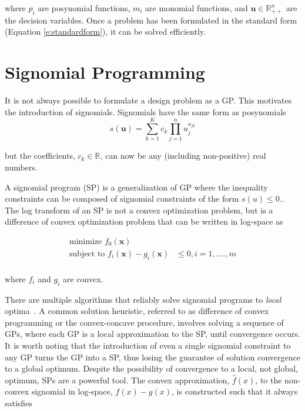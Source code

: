 where $p_{i}$ are posynomial functions, $m_{i}$ are monomial functions, and
$\mathbf{u} \in \mathbb{R}^n_{++}$ are the decision variables. Once a problem
has been formulated in the standard form (Equation \ref{e:standardform}), it can
be solved efficiently.

\section{Signomial Programming}
\label{a:spintro}
It is not always possible to formulate a design problem as a GP. This motivates
the introduction of signomials. Signomials have the same form as posynomials
\begin{equation}\label{e:signomial}
s(\mathbf{u}) = \sum_{k=1}^{K}c_{k}\prod_{j=1}^{n} u_{j}^{a_{jk}}
\end{equation}

but the coefficients, $c_{k} \in \mathbb{R}$, can now be any (including
non-positive) real numbers.

A signomial program (SP) is a generalization of GP where the inequality
constraints can be composed of signomial constraints of the form $s(u) \leq 0$..
The log transform of an SP is not a convex optimization problem, but is a
difference of convex optimization problem that can be written in log-space as

\begin{equation}
\begin{aligned}
\text{minimize }f_{0}(\mathbf{x})& \\
\text{subject to }f_{i}(\mathbf{x}) -  g_{i}(\mathbf{x})& \leq 0, i = 1, ...., m
\\
\end{aligned}
\end{equation}

where $f_{i}$ and $g_{i}$ are convex.

There are multiple algorithms that reliably solve signomial programs to
\textit{local} optima~\cite{gpintro, spsolutions}. A common solution heuristic,
referred to as difference of convex programming or the convex-concave procedure,
involves solving a sequence of GPs, where each GP is a local approximation to
the SP, until convergence occurs. It is worth noting that the introduction of
even a single signomial constraint to any GP turns the GP into a \gls{SP}, thus losing
the guarantee of solution convergence to a global optimum. Despite the
possibility of convergence to a local, not global, optimum, SPs are a powerful
tool. The convex approximation, $\hat{f}(x)$, to the non-convex signomial in
log-space, $f(x) - g(x)$, is constructed such that it always satisfies

